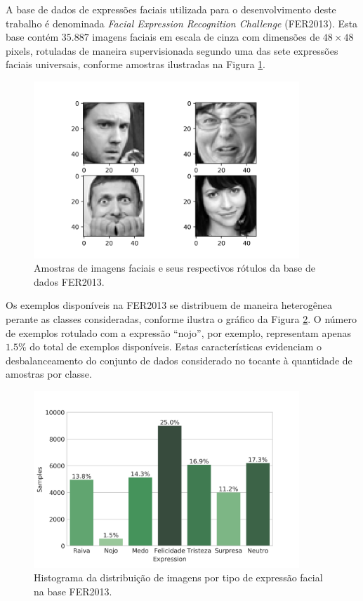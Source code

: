 A base de dados de expressões faciais utilizada para o desenvolvimento deste trabalho é denominada \emph{Facial Expression Recognition Challenge} (FER2013). Esta base contém $35.887$ imagens faciais em escala de cinza com dimensões de $48\times 48$ pixels, rotuladas de maneira supervisionada segundo uma das sete expressões faciais universais, conforme amostras ilustradas na Figura \ref{fig:samples}. 

\begin{figure}[!htb]
    \centering
    \caption{Amostras de imagens faciais e seus respectivos rótulos da base de dados FER2013.} \label{fig:samples}
    \includegraphics[width=10cm]{images/samples.png}
\end{figure}

Os exemplos disponíveis na FER2013 se distribuem de maneira heterogênea perante as classes consideradas, conforme ilustra o gráfico da Figura \ref{fig:dataset}. O número de exemplos rotulado com a expressão ``nojo'', por exemplo, representam apenas $1.5\%$ do total de exemplos disponíveis. Estas características evidenciam o desbalanceamento do conjunto de dados considerado no tocante à quantidade de amostras por classe. 

\begin{figure}[!htb]
    \centering
    \caption{Histograma da distribuição de imagens por tipo de expressão facial na base FER2013.}  \label{fig:dataset}
    \includegraphics[width=10cm]{images/expression_distribution.png}
\end{figure}



